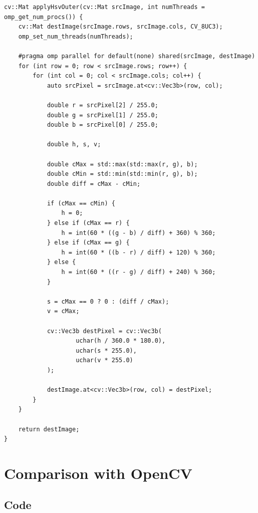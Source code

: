 \begin{listing}[H]
    \begin{verbatim}
cv::Mat applyHsvOuter(cv::Mat srcImage, int numThreads = omp_get_num_procs()) {
    cv::Mat destImage(srcImage.rows, srcImage.cols, CV_8UC3);
    omp_set_num_threads(numThreads);

    #pragma omp parallel for default(none) shared(srcImage, destImage)
    for (int row = 0; row < srcImage.rows; row++) {
        for (int col = 0; col < srcImage.cols; col++) {
            auto srcPixel = srcImage.at<cv::Vec3b>(row, col);

            double r = srcPixel[2] / 255.0;
            double g = srcPixel[1] / 255.0;
            double b = srcPixel[0] / 255.0;

            double h, s, v;

            double cMax = std::max(std::max(r, g), b);
            double cMin = std::min(std::min(r, g), b);
            double diff = cMax - cMin;

            if (cMax == cMin) {
                h = 0;
            } else if (cMax == r) {
                h = int(60 * ((g - b) / diff) + 360) % 360;
            } else if (cMax == g) {
                h = int(60 * ((b - r) / diff) + 120) % 360;
            } else {
                h = int(60 * ((r - g) / diff) + 240) % 360;
            }

            s = cMax == 0 ? 0 : (diff / cMax);
            v = cMax;

            cv::Vec3b destPixel = cv::Vec3b(
                    uchar(h / 360.0 * 180.0),
                    uchar(s * 255.0),
                    uchar(v * 255.0)
            );

            destImage.at<cv::Vec3b>(row, col) = destPixel;
        }
    }

    return destImage;
}
    \end{verbatim}
    \label{listing:hsv}
\end{listing}

\section{Comparison with OpenCV}

\subsection{Code}

